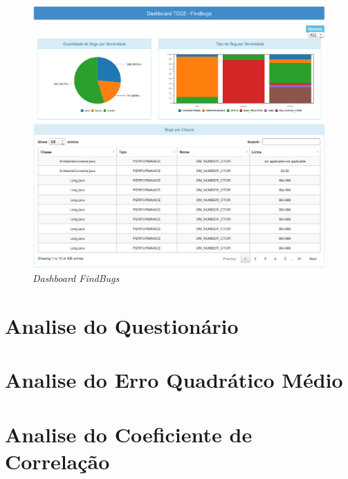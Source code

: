 \begin{figure}[h!]
\centering
\includegraphics[keepaspectratio=false,scale=0.5]{figuras/figuras_nilton/DashboardFindbugs.eps}
\caption{\textit{Dashboard FindBugs}}
\label{dashboardCenarios}
\end{figure}

\section{Analise do Questionário}

\section{Analise do Erro Quadrático Médio}

\section{Analise do Coeficiente de Correlação}
